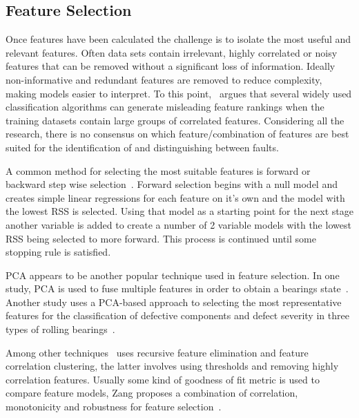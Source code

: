 \documentclass[]{article}
\begin{document}
\subsection{Feature Selection}
Once features have been calculated the challenge is to isolate the most useful and relevant features. Often data sets contain irrelevant, highly correlated or noisy features that can be removed without a significant loss of information. Ideally non-informative and redundant features are removed to reduce complexity, making models easier to interpret. To this point,~\cite{tolocsi2011classification} argues that several widely used classification algorithms can generate misleading feature rankings when the training datasets contain large groups of correlated features. Considering all the research, there is no consensus on which feature/combination of features are best suited for the identification of and distinguishing between faults. 

A common method for selecting the most suitable features is forward or backward step wise selection~\cite{james2013introduction}. Forward selection begins with a null model and creates simple linear regressions for each feature on it's own and the model with the lowest RSS is selected. Using that model as a starting point for the next stage another variable is added to create a number of 2 variable models with the lowest RSS being selected to more forward. This process is continued until some stopping rule is satisfied.

\gls{PCA} appears to be another popular technique used in feature selection. In one study, PCA is used to fuse multiple features in order to obtain a bearings state~\cite{lu2016degradation}. Another study uses a PCA-based approach to selecting the most representative features for the classification of defective components and defect severity in three types of rolling bearings~\cite{malhi2004pca}. 

Among other techniques~\cite{buckley2023feature} uses recursive feature elimination and feature correlation clustering, the latter involves using thresholds and removing highly correlation features. Usually some kind of goodness of fit metric is used to compare feature models, Zang proposes a combination of correlation, monotonicity and robustness for feature selection~\cite{zhang2016degradation}.

\end{document}
